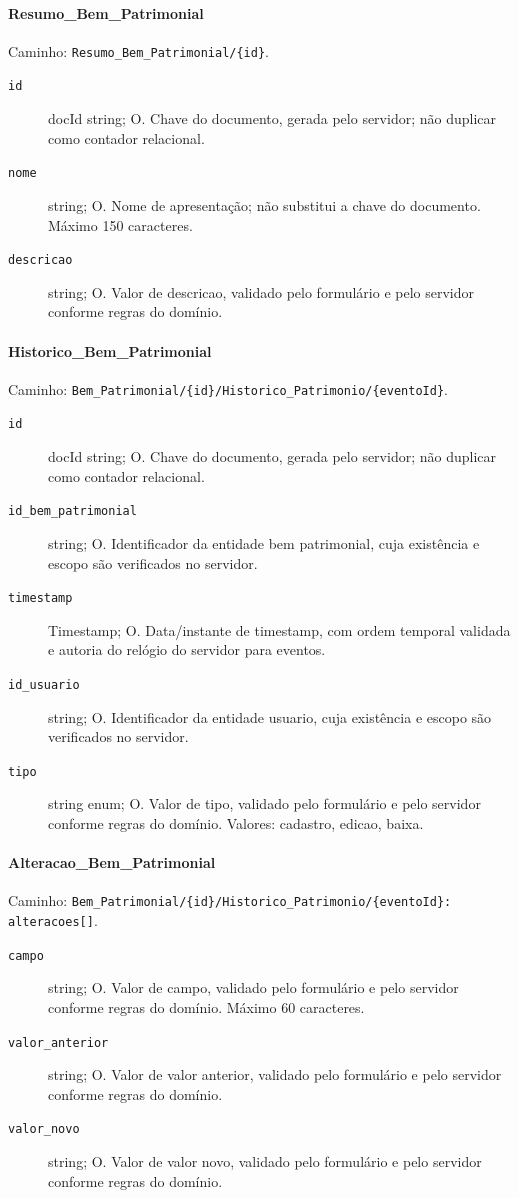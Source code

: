 \paragraph{Resumo\_Bem\_Patrimonial}\mbox{}\par
Caminho: \texttt{Resumo\_Bem\_Patrimonial/\{id\}}.
\begin{description}
\item[\texttt{id}] docId string; O. Chave do documento, gerada pelo servidor; não duplicar como contador relacional.
\item[\texttt{nome}] string; O. Nome de apresentação; não substitui a chave do documento. Máximo 150 caracteres.
\item[\texttt{descricao}] string; O. Valor de descricao, validado pelo formulário e pelo servidor conforme regras do domínio.
\end{description}

\paragraph{Historico\_Bem\_Patrimonial}\mbox{}\par
Caminho: \texttt{Bem\_Patrimonial/\{id\}/Historico\_Patrimonio/\{eventoId\}}.
\begin{description}
\item[\texttt{id}] docId string; O. Chave do documento, gerada pelo servidor; não duplicar como contador relacional.
\item[\texttt{id\_bem\_patrimonial}] string; O. Identificador da entidade bem patrimonial, cuja existência e escopo são verificados no servidor.
\item[\texttt{timestamp}] Timestamp; O. Data/instante de timestamp, com ordem temporal validada e autoria do relógio do servidor para eventos.
\item[\texttt{id\_usuario}] string; O. Identificador da entidade usuario, cuja existência e escopo são verificados no servidor.
\item[\texttt{tipo}] string enum; O. Valor de tipo, validado pelo formulário e pelo servidor conforme regras do domínio. Valores: cadastro, edicao, baixa.
\end{description}

\paragraph{Alteracao\_Bem\_Patrimonial}\mbox{}\par
Caminho: \texttt{Bem\_Patrimonial/\{id\}/Historico\_Patrimonio/\{eventoId\}: alteracoes[]}.
\begin{description}
\item[\texttt{campo}] string; O. Valor de campo, validado pelo formulário e pelo servidor conforme regras do domínio. Máximo 60 caracteres.
\item[\texttt{valor\_anterior}] string; O. Valor de valor anterior, validado pelo formulário e pelo servidor conforme regras do domínio.
\item[\texttt{valor\_novo}] string; O. Valor de valor novo, validado pelo formulário e pelo servidor conforme regras do domínio.
\end{description}


